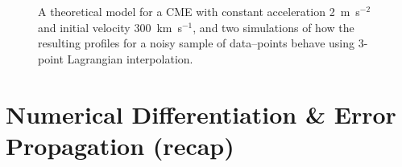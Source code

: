\documentclass[structabstract]{aa}
\begin{document}
\begin{figure}[!ht]
\caption{A theoretical model for a CME with constant acceleration 2~m~s$^{-2}$ and initial velocity 300~km~s$^{-1}$, and two simulations of how the resulting profiles for a noisy sample of data--points behave using 3-point Lagrangian interpolation.}
\label{sim_vels_thesis}
\end{figure}

\section{Numerical Differentiation \& Error Propagation (recap)}
\label{sect:num_diff_errors}
\end{document}
